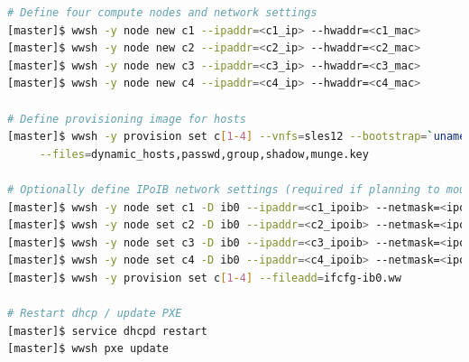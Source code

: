 \documentclass[letterpaper]{article}
\begin{document}

\begin{lstlisting}[language=bash,keywords={},upquote=true,basicstyle=\footnotesize\ttfamily]
# Define four compute nodes and network settings 
[master]$ wwsh -y node new c1 --ipaddr=<c1_ip> --hwaddr=<c1_mac> 
[master]$ wwsh -y node new c2 --ipaddr=<c2_ip> --hwaddr=<c2_mac> 
[master]$ wwsh -y node new c3 --ipaddr=<c3_ip> --hwaddr=<c3_mac> 
[master]$ wwsh -y node new c4 --ipaddr=<c4_ip> --hwaddr=<c4_mac> 

# Define provisioning image for hosts
[master]$ wwsh -y provision set c[1-4] --vnfs=sles12 --bootstrap=`uname -r` \
     --files=dynamic_hosts,passwd,group,shadow,munge.key 

# Optionally define IPoIB network settings (required if planning to mount Lustre* over IB)
[master]$ wwsh -y node set c1 -D ib0 --ipaddr=<c1_ipoib> --netmask=<ipoib_netmask>
[master]$ wwsh -y node set c2 -D ib0 --ipaddr=<c2_ipoib> --netmask=<ipoib_netmask>
[master]$ wwsh -y node set c3 -D ib0 --ipaddr=<c3_ipoib> --netmask=<ipoib_netmask>
[master]$ wwsh -y node set c4 -D ib0 --ipaddr=<c4_ipoib> --netmask=<ipoib_netmask>
[master]$ wwsh -y provision set c[1-4] --fileadd=ifcfg-ib0.ww

# Restart dhcp / update PXE
[master]$ service dhcpd restart
[master]$ wwsh pxe update
\end{lstlisting}


\end{document}

